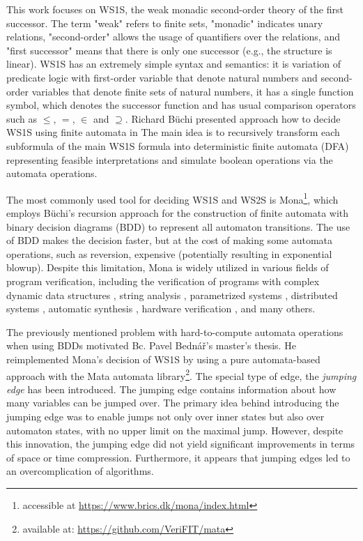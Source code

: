 \documentclass[pdflatex,sn-mathphys-num]{sn-jnl}%
\theoremstyle{thmstyleone}%
\theoremstyle{thmstyletwo}%
\theoremstyle{thmstylethree}%
\begin{document}
    This work focuses on WS1S, the weak monadic second-order theory of the first successor. The term "weak" refers to finite sets, "monadic" indicates unary relations, "second-order" allows the usage of quantifiers over the relations, and "first successor" means that there is only one successor (e.g., the structure is linear).  WS1S \cite{WS1S} has an extremely simple syntax and semantics: it is variation of predicate logic with first-order variable that denote natural numbers and second-order variables that denote finite sets of natural numbers, it has a single function symbol, which denotes the successor function and has usual comparison operators such as $\leq$, $=$, $\in$ and $\supseteq$. Richard Büchi presented approach how to decide WS1S using finite automata in \cite{Buchi} The main idea is to recursively transform each subformula of the main WS1S formula into deterministic finite automata (DFA) representing feasible interpretations and simulate boolean operations via the automata operations.

    The most commonly used tool for deciding WS1S and WS2S is Mona\footnote{accessible at \url{https://www.brics.dk/mona/index.html}}, which employs Büchi's recursion approach for the construction of finite automata with binary decision diagrams (BDD) to represent all automaton transitions. The use of BDD makes the decision faster, but at the cost of making some automata operations, such as reversion, expensive (potentially resulting in exponential blowup). Despite this limitation, Mona is widely utilized in various fields of program verification, including the verification of programs with complex dynamic data structures \cite{DDS1, DDS2}, string analysis \cite{string_analysis}, parametrized systems \cite{parametrized_systems}, distributed systems \cite{distributed_systems}, automatic synthesis \cite{automatic_synthesis}, hardware verification \cite{hardware_verification}, and many others.

    The previously mentioned problem with hard-to-compute automata operations when using BDDs motivated Bc. Pavel Bednář's master's thesis. He reimplemented Mona's decision of WS1S by using a pure automata-based approach with the Mata automata library\footnote{available at: \url{https://github.com/VeriFIT/mata}}. The special type of edge, the \textit{jumping edge} has been introduced. The jumping edge contains information about how many variables can be jumped over. The primary idea behind introducing the jumping edge was to enable jumps not only over inner states but also over automaton states, with no upper limit on the maximal jump. However, despite this innovation, the jumping edge did not yield significant improvements in terms of space or time compression. Furthermore, it appears that jumping edges led to an overcomplication of algorithms.
\end{document}
